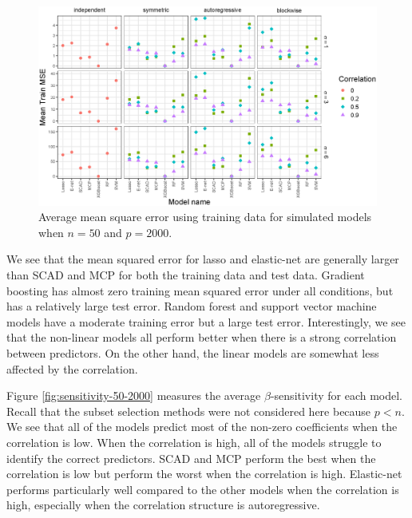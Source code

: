 \documentclass{article}
\begin{document}
\begin{figure}[b!]
	\centering
	\includegraphics[width = \textwidth]{images/facet-train-mse/facet_train_mse_50_2000.eps}
	\captionsetup{width = 0.8\textwidth}
	\caption{Average mean square error using training data for simulated models when $n = 50$ and $p = 2000$.}
	\label{fig:train-mse-50-2000}
\end{figure}

We see that the mean squared error for lasso and elastic-net are generally larger than SCAD and MCP for both the training data and test data. Gradient boosting has almost zero training mean squared error under all conditions, but has a relatively large test error. Random forest and support vector machine models have a moderate training error but a large test error. Interestingly, we see that the non-linear models all perform better when there is a strong correlation between predictors. On the other hand, the linear models are somewhat less affected by the correlation.

Figure \ref{fig:sensitivity-50-2000} measures the average $\beta$-sensitivity for each model. Recall that the subset selection methods were not considered here because $p < n$. We see that all of the models predict most of the non-zero coefficients when the correlation is low. When the correlation is high, all of the models struggle to identify the correct predictors. SCAD and MCP perform the best when the correlation is low but perform the worst when the correlation is high. Elastic-net performs particularly well compared to the other models when the correlation is high, especially when the correlation structure is autoregressive.
\end{document}
